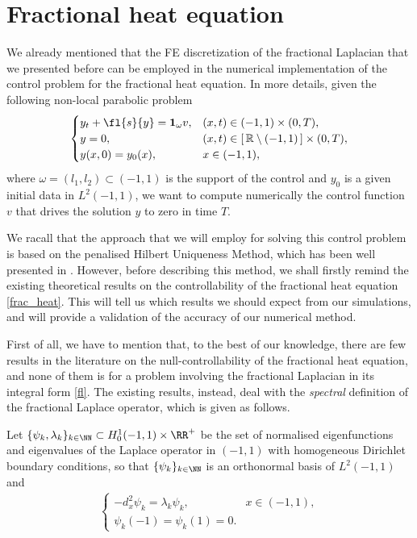 \section{Fractional heat equation}

We already mentioned that the FE discretization of the fractional Laplacian that we presented before can be employed in the numerical implementation of the control problem for the fractional heat equation. In more details, given the following non-local parabolic problem 
\begin{align}\label{frac_heat}
	\begin{cases}
		y_t+\fl{s}{y} =\mathbf{1}_\omega v, & (x,t)\in (-1,1)\times (0,T), 
		\\
		y=0, & (x,t)\in [\,\mathbb{R} \setminus (-1,1)\,]\times (0,T), 
		\\
		y(x,0)=y_0(x), & x\in (-1,1),
	\end{cases}
\end{align}
where $\omega=(l_1,l_2)\subset (-1,1)$ is the support of the control and $y_0$ is a given initial data in $L^2(-1,1)$, we want to compute numerically the control function $v$ that drives the solution $y$ to zero in time $T$. 

We racall that the approach that we will employ for solving this control problem is based on the penalised Hilbert Uniqueness Method, which has been well presented in \cite{boyer2013penalised}. However, before describing this method, we shall firstly remind the existing theoretical results on the controllability of the fractional heat equation \eqref{frac_heat}. This will tell us which results we should expect from our simulations, and will provide a validation of the accuracy of our numerical method.

First of all, we have to mention that, to the best of our knowledge, there are few results in the literature on the null-controllability of the fractional heat equation, and none of them is for a problem involving the fractional Laplacian in its integral form \eqref{fl}. The existing results, instead, deal with the \textit{spectral} definition of the fractional Laplace operator, which is given as follows.

Let $\{\psi_k,\lambda_k\}_{k\in\NN}\subset H_0^1(-1,1)\times\RR^+$ be the set of normalised eigenfunctions and eigenvalues of the Laplace operator in $(-1,1)$ with homogeneous Dirichlet boundary conditions, so that $\{\psi_k\}_{k\in\NN}$ is an orthonormal basis of $L^2(-1,1)$ and         
\begin{align*}
	\begin{cases}
		-d_x^2\psi_k =\lambda_k\psi_k, & x\in (-1,1), 
		\\
		\psi_k(-1)=\psi_k(1)=0.
	\end{cases}
\end{align*}

